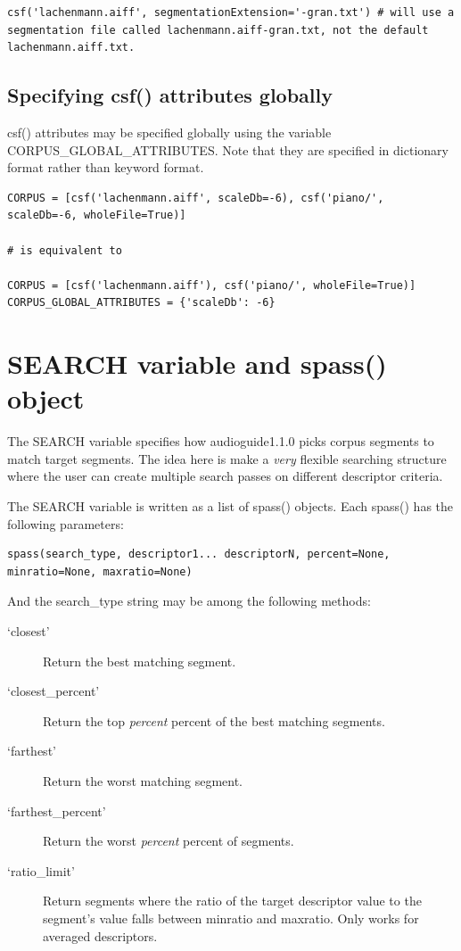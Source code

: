 \documentclass{article}
\newcommand{\ag}{audioguide1.1.0\xspace}
\begin{document}
\begin{spacing}{1.2}
\begin{lstlisting}
csf('lachenmann.aiff', segmentationExtension='-gran.txt') # will use a segmentation file called lachenmann.aiff-gran.txt, not the default lachenmann.aiff.txt.
\end{lstlisting}


\subsection{Specifying csf() attributes globally}\label{globalcorpus}
csf() attributes may be specified globally using the variable CORPUS\_GLOBAL\_ATTRIBUTES.  Note that they are specified in dictionary format rather than keyword format.

\begin{lstlisting}
CORPUS = [csf('lachenmann.aiff', scaleDb=-6), csf('piano/', scaleDb=-6, wholeFile=True)]

# is equivalent to 

CORPUS = [csf('lachenmann.aiff'), csf('piano/', wholeFile=True)]
CORPUS_GLOBAL_ATTRIBUTES = {'scaleDb': -6}
\end{lstlisting}


\section{SEARCH variable and spass() object}
The SEARCH variable specifies how \ag picks corpus segments to match target segments.  The idea here is make a \emph{very} flexible searching structure where the user can create multiple search passes on different descriptor criteria.

The SEARCH variable is written as a list of spass() objects.  Each spass() has the following parameters: 
\begin{lstlisting}
spass(search_type, descriptor1... descriptorN, percent=None, minratio=None, maxratio=None)
\end{lstlisting}

And the search\_type string may be among the following methods:
\begin{description}
\item[`closest'] Return the best matching segment.
\item[`closest\_percent'] Return the top \emph{percent} percent of the best matching segments.
\item[`farthest'] Return the worst matching segment.
\item[`farthest\_percent'] Return the worst \emph{percent} percent of segments.
\item[`ratio\_limit'] Return segments where the ratio of the target descriptor value to the segment's value falls between minratio and maxratio.  Only works for averaged descriptors.
\end{description}



\end{spacing}
\end{document}
